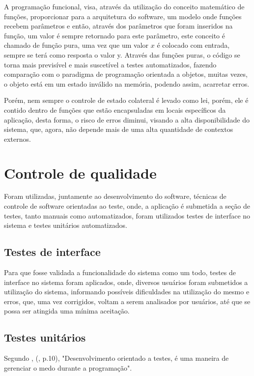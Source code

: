A programação funcional, visa, através da utilização do conceito matemático de funções, proporcionar para a arquitetura do software, um modelo onde funções recebem parâmetros e então, através dos parâmetros que foram inseridos na função, um valor é sempre retornado para este parâmetro, este conceito é chamado de função pura, uma vez que um valor $x$ é colocado com entrada, sempre se terá como resposta o valor y. Através das funções puras, o código se torna mais previsível e mais suscetível a testes automatizados, fazendo comparação com o paradigma de programação orientada a objetos, muitas vezes, o objeto está em um estado inválido na memória, podendo assim, acarretar erros.

Porém, nem sempre o controle de estado colateral é levado como lei, porém, ele é contido dentro de funções que estão encapsuladas em locais específicos da aplicação, desta forma, o risco de erros diminui, visando a alta disponibilidade do sistema, que, agora, não depende mais de uma alta quantidade de contextos externos.

\section{Controle de qualidade}

Foram utilizadas, juntamente ao desenvolvimento do software, técnicas de controle de software orientadas ao teste, onde, a aplicação é submetida a seção de testes, tanto manuais como automatizados, foram utilizados testes de interface no sistema e testes unitários automatizados.

\subsection{Testes de interface}

Para que fosse validada a funcionalidade do sistema como um todo, testes de interface no sistema foram aplicados, onde, diversos usuários foram submetidos a utilização do sistema, informando possíveis dificuldades na utilização do mesmo e erros, que, uma vez corrigidos, voltam a serem analisados por usuários, até que se possa ser atingida uma mínima aceitação.

\subsection{Testes unitários}

Segundo , (\citeyear{tdd_by_example}, p.10), "Desenvolvimento orientado a testes, é uma maneira de gerenciar o medo durante a programação".

